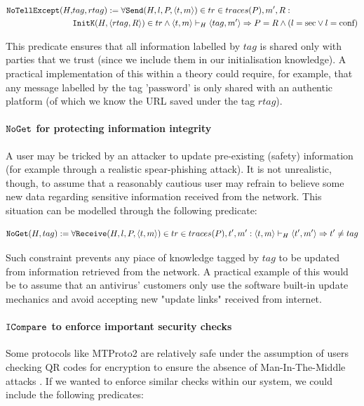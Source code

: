 \documentclass{article}
\newcommand{\mono}[1]{\textrm{\tt #1}}
\begin{document}
\begin{align*}
    \mono{NoTellExcept}(H,&tag,rtag) := \forall \mono{Send}(H,l,P,\langle t,m \rangle) \in tr \in traces(P), m', R : \\
    &\mono{InitK}(H, \langle rtag, R \rangle) \in tr \land \langle t,m \rangle \vdash_H \langle tag, m' \rangle \Rightarrow P = R \land (l=\textrm{sec} \lor l = \textrm{conf})
\end{align*}

This predicate ensures that all information labelled by $tag$ is shared only with parties that we trust (since we include them in our initialisation knowledge). A practical implementation of this within a theory could require, for example, that any message labelled by the tag $\textrm{'password'}$ is only shared with an authentic platform (of which we know the URL saved under the tag $rtag$).

\paragraph{$\mono{NoGet}$ for protecting information integrity}

A user may be tricked by an attacker to update pre-existing (safety) information (for example through a realistic spear-phishing attack). It is not unrealistic, though, to assume that a reasonably cautious user may refrain to believe some new data regarding sensitive information received from the network. This situation can be modelled through the following predicate:

\begin{equation*}
    \mono{NoGet}(H,tag) := \forall \mono{Receive}(H,l,P,\langle t,m \rangle) \in tr \in traces(P), t', m' : \langle t, m \rangle \vdash_H \langle t', m' \rangle \Rightarrow t' \not = tag
\end{equation*}

Such constraint prevents any piace of knowledge tagged by $tag$ to be updated from information retrieved from the network. A practical example of this would be to assume that an antivirus' customers only use the software built-in update mechanics and avoid accepting new "update links" received from internet.

\paragraph{$\mono{ICompare}$ to enforce important security checks}

Some protocols like MTProto2 are relatively safe under the assumption of users checking QR codes for encryption to ensure the absence of Man-In-The-Middle attacks \cite{Miculan_2023}. If we wanted to enforce similar checks within our system, we could include the following predicates:
\end{document}

